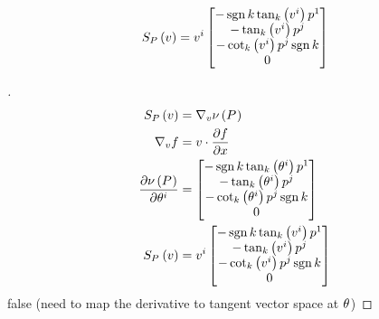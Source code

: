 \documentclass[stu, babel, american, biblatex, a4paper, draftall]{apa7}
\begin{document}
\begin{lemma}\label{Model:ShapeOperator}
    \begin{equation*}
        S_{P}\left(v\right)
        = \tensor{v}{^i} \begin{bmatrix}
            -\sign{k}\tan_k\left(\tensor{v}{^i}\right)\tensor{p}{^1}       \\
            -\tan_k\left(\tensor{v}{^i}\right)\tensor{p}{^j} \\
            -\cot_k\left(\tensor{v}{^i}\right)\tensor{p}{^j}\sign{k}\\
            0 \\
        \end{bmatrix}
    \end{equation*}
\end{lemma}
\begin{proof}[]
    \skipped

    \begin{align*}
        S_{P}\left(v\right)
        &= \nabla_v \nu\left(\tensor{P}{}\right) \\
        \nabla_v f &= v \cdot \frac{\partial f}{\partial x}\\
        \frac{\partial\nu\left(\tensor{P}{}\right)}{\partial\tensor{\theta}{^i}}
        &= \begin{bmatrix}
            -\sign{k}\tan_k\left(\tensor{\theta}{^i}\right)\tensor{p}{^1}       \\
            -\tan_k\left(\tensor{\theta}{^i}\right)\tensor{p}{^j} \\
            -\cot_k\left(\tensor{\theta}{^i}\right)\tensor{p}{^j}\sign{k}\\
            0 \\
        \end{bmatrix}\\
        S_{\tensor{P}{}}\left(v\right)
        &= \tensor{v}{^i} \begin{bmatrix}
            -\sign{k}\tan_k\left(\tensor{v}{^i}\right)\tensor{p}{^1}       \\
            -\tan_k\left(\tensor{v}{^i}\right)\tensor{p}{^j} \\
            -\cot_k\left(\tensor{v}{^i}\right)\tensor{p}{^j}\sign{k}\\
            0 \\
        \end{bmatrix}
    \end{align*}
    false (need to map the derivative to tangent vector space at $\tensor{\theta}{}$)
\end{proof}
\end{document}
